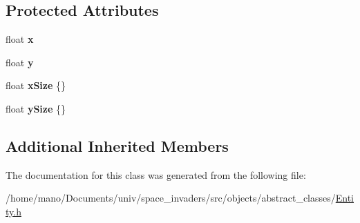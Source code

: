 \subsection*{Protected Attributes}
\begin{DoxyCompactItemize}
\item 
\mbox{\label{classobjects_1_1Entity_a5f6bfef09f32ec0318c4e9b31f3f5d30}}
float {\bfseries x}
\item 
\mbox{\label{classobjects_1_1Entity_ad86552a73f78657191886938a112650d}}
float {\bfseries y}
\item 
\mbox{\label{classobjects_1_1Entity_a6c6229b1adff361f2417be10f9c40f9e}}
float {\bfseries x\+Size} \{\}
\item 
\mbox{\label{classobjects_1_1Entity_a62e94bd59fe6248b0e1d61e470d7b2b7}}
float {\bfseries y\+Size} \{\}
\end{DoxyCompactItemize}
\subsection*{Additional Inherited Members}


The documentation for this class was generated from the following file\+:\begin{DoxyCompactItemize}
\item 
/home/mano/\+Documents/univ/space\+\_\+invaders/src/objects/abstract\+\_\+classes/\hyperlink{Entity_8h}{Entity.\+h}\end{DoxyCompactItemize}
